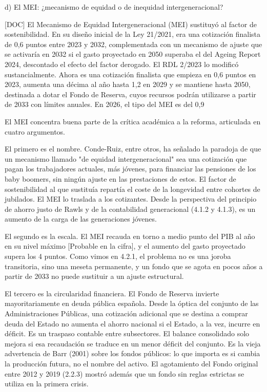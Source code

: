 \documentclass[10pt,a4paper]{article}
\begin{document}
d) El MEI: ¿mecanismo de equidad o de inequidad intergeneracional?

[DOC] El Mecanismo de Equidad Intergeneracional (MEI) sustituyó al factor de sostenibilidad. En su diseño inicial de la Ley 21/2021, era una cotización finalista de 0,6 puntos entre 2023 y 2032, complementada con un mecanismo de ajuste que se activaría en 2032 si el gasto proyectado en 2050 superaba el del Ageing Report 2024, descontado el efecto del factor derogado. El RDL 2/2023 lo modificó sustancialmente. Ahora es una cotización finalista que empieza en 0,6 puntos en 2023, aumenta una décima al año hasta 1,2 en 2029 y se mantiene hasta 2050, destinada a dotar el Fondo de Reserva, cuyos recursos podrán utilizarse a partir de 2033 con límites anuales. En 2026, el tipo del MEI es del 0,9%

El MEI concentra buena parte de la crítica académica a la reforma, articulada en cuatro argumentos.

El primero es el nombre. Conde-Ruiz, entre otros, ha señalado la paradoja de que un mecanismo llamado "de equidad intergeneracional" sea una cotización que pagan los trabajadores actuales, más jóvenes, para financiar las pensiones de los baby boomers, sin ningún ajuste en las prestaciones de estos. El factor de sostenibilidad al que sustituía repartía el coste de la longevidad entre cohortes de jubilados. El MEI lo traslada a los cotizantes. Desde la perspectiva del principio de ahorro justo de Rawls y de la contabilidad generacional (4.1.2 y 4.1.3), es un aumento de la carga de las generaciones jóvenes.

El segundo es la escala. El MEI recauda en torno a medio punto del PIB al año en su nivel máximo [Probable en la cifra], y el aumento del gasto proyectado supera los 4 puntos. Como vimos en 4.2.1, el problema no es una joroba transitoria, sino una meseta permanente, y un fondo que se agota en pocos años a partir de 2033 no puede sustituir a un ajuste estructural.

El tercero es la circularidad financiera. El Fondo de Reserva invierte mayoritariamente en deuda pública española. Desde la óptica del conjunto de las Administraciones Públicas, una cotización adicional que se destina a comprar deuda del Estado no aumenta el ahorro nacional si el Estado, a la vez, incurre en déficit. Es un traspaso contable entre subsectores. El balance consolidado solo mejora si esa recaudación se traduce en un menor déficit del conjunto. Es la vieja advertencia de Barr (2001) sobre los fondos públicos: lo que importa es si cambia la producción futura, no el nombre del activo. El agotamiento del Fondo original entre 2012 y 2019 (2.2.3) mostró además que un fondo sin reglas estrictas se utiliza en la primera crisis.
\end{document}
